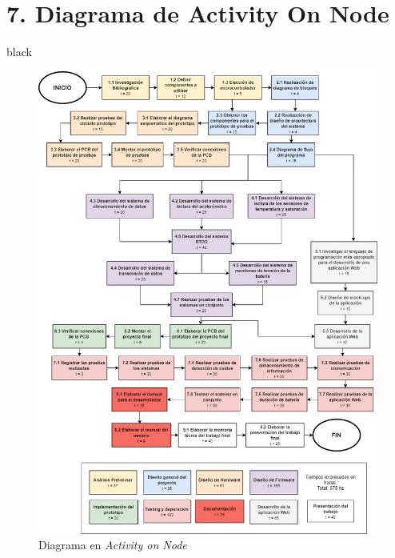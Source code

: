 \documentclass[11pt]{charter}
\begin{document}
\newpage
\section{7. Diagrama de Activity On Node}
\label{sec:AoN}

\begin{consigna}{black} 


\vspace{-15px}
\begin{figure}[!htpb]
\centering 
\includegraphics[width=1\textwidth]{./Figuras/AoN.png}
\caption{Diagrama en \textit{Activity on Node}}
\label{fig:AoN}
\end{figure}

\end{consigna}
\end{document}
